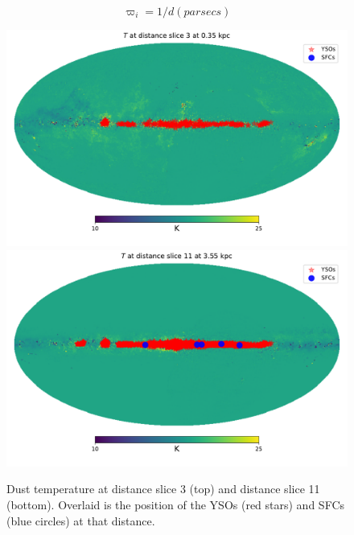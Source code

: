 \documentclass[12pt]{article}
\begin{document}
\begin{equation}
    {\varpi_{i}} = 1/d  (parsecs)
    \label{eq:parallaxeq}
\end{equation}

\begin{figure}
    \centering
    \includegraphics[width=0.75\linewidth]{tempmap_3.pdf}
    \includegraphics[width=0.75\linewidth]{tempmap_11.pdf}
    \caption{Dust temperature at distance slice 3 (top) and distance slice 11 (bottom). Overlaid is the position of the YSOs (red stars) and SFCs (blue circles) at that distance. }
    \label{fig:tempmap}
    
\end{figure}



\newpage

\printbibliography
\end{document}
